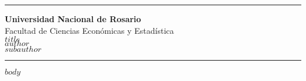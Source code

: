\documentclass[11pt,a4paper]{article}
\begin{document}
\thispagestyle{empty}
\noindent\rule{\textwidth}{1.5pt}
\begin{center}
	\textbf{{\LARGE Universidad Nacional de Rosario}}\\
	\vspace{0.2cm}
	{\Large Facultad de Ciencias Económicas y Estadística}\\
	\vspace{0.2cm}
	{\large $title$}\\
	\vspace{0.2cm}
	\textsc{$author$} \\
	\vspace{0.2cm}
	$subauthor$
\end{center}
\vspace{-0.3cm}
\noindent\rule{\textwidth}{1.5pt}

\renewcommand{\figurename}{Figura}
\renewcommand{\tablename}{Tabla}

$body$
\end{document}
